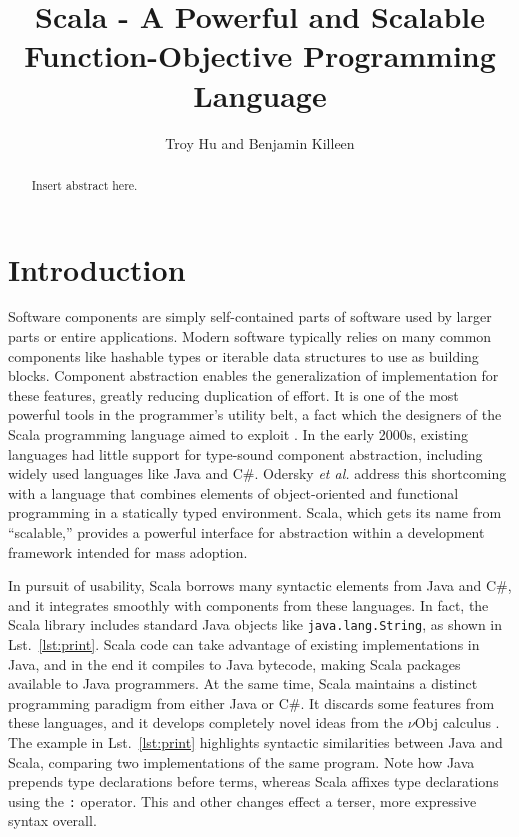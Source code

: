 \documentclass[jou,apacite]{IEEEtran}
\title{Scala - A Powerful and Scalable Function-Objective Programming Language}
\author{Troy Hu and Benjamin Killeen} %
\begin{document}
\maketitle    

\begin{abstract}
Insert abstract here.
\end{abstract}                     

\section{Introduction}
\label{sec:intro}

Software components are simply self-contained parts of software used by larger
parts or entire applications. Modern software typically relies on many common
components like hashable types or iterable data structures to use as building
blocks. Component abstraction enables the generalization of implementation for
these features, greatly reducing duplication of effort. It is one of the most
powerful tools in the programmer's utility belt, a fact which the designers of
the Scala programming language aimed to exploit \cite{odersky2004overview}. In
the early 2000s, existing languages had little support for type-sound component
abstraction, including widely used languages like Java and C\#. Odersky \emph{et
  al.} address this shortcoming with a language that combines elements of
object-oriented and functional programming in a statically typed
environment. Scala, which gets its name from ``scalable,'' provides a powerful
interface for abstraction within a development framework intended for mass
adoption.

In pursuit of usability, Scala borrows many syntactic elements from Java and
C\#, and it integrates smoothly with components from these languages. In fact,
the Scala library includes standard Java objects like \texttt{java.lang.String},
as shown in Lst.~\ref{lst:print}. Scala code can take advantage of existing
implementations in Java, and in the end it compiles to Java bytecode, making
Scala packages available to Java programmers. At the same time, Scala maintains
a distinct programming paradigm from either Java or C\#. It discards some
features from these languages, and it develops completely novel ideas from the
$\nu$Obj calculus \cite{odersky_nominal_2003}. The example in
Lst.~\ref{lst:print} highlights syntactic similarities between Java and Scala,
comparing two implementations of the same program. Note how Java prepends type
declarations before terms, whereas Scala affixes type declarations using the
\texttt{:} operator. This and other changes effect a terser, more expressive
syntax overall.
\end{document}

